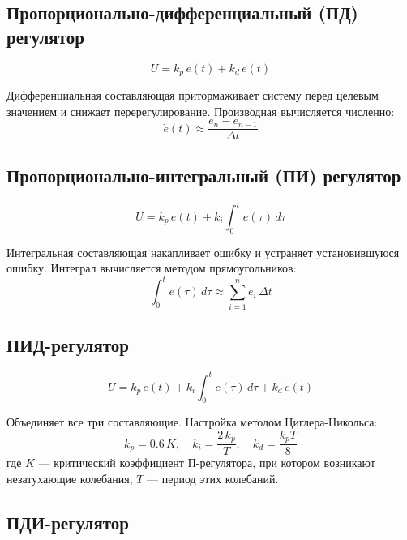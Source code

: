 \documentclass[a4paper, 12pt]{article}
\begin{document}
\subsection{Пропорционально-дифференциальный (ПД) регулятор}

\begin{equation}
U = k_p\, e(t) + k_d\, \dot{e}(t)
\end{equation}

Дифференциальная составляющая притормаживает систему перед целевым значением и снижает
перерегулирование. Производная вычисляется численно:
\begin{equation}
\dot{e}(t) \approx \frac{e_n - e_{n-1}}{\Delta t}
\end{equation}

\subsection{Пропорционально-интегральный (ПИ) регулятор}

\begin{equation}
U = k_p\, e(t) + k_i \int_0^t e(\tau)\,d\tau
\end{equation}

Интегральная составляющая накапливает ошибку и устраняет установившуюся ошибку.
Интеграл вычисляется методом прямоугольников:
\begin{equation}
\int_0^t e(\tau)\,d\tau \approx \sum_{i=1}^{n} e_i\,\Delta t
\end{equation}

\subsection{ПИД-регулятор}

\begin{equation}
U = k_p\, e(t) + k_i \int_0^t e(\tau)\,d\tau + k_d\, \dot{e}(t)
\end{equation}

Объединяет все три составляющие. Настройка методом Циглера-Никольса:
\begin{equation}
k_p = 0.6\,K, \quad k_i = \frac{2\,k_p}{T}, \quad k_d = \frac{k_p T}{8}
\end{equation}
где $K$ --- критический коэффициент П-регулятора, при котором возникают незатухающие
колебания, $T$ --- период этих колебаний.

\subsection{ПДИ-регулятор}
\end{document}
